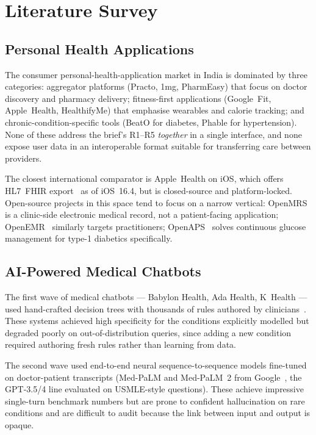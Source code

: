 \documentclass[12pt]{caltech_thesis}
\begin{document}

\chapter{Literature Survey}
\label{ch:lit}

\section{Personal Health Applications}

The consumer personal-health-application market in India is dominated by
three categories: aggregator platforms (Practo, 1mg, PharmEasy) that
focus on doctor discovery and pharmacy delivery; fitness-first applications
(Google~Fit, Apple~Health, HealthifyMe) that emphasise wearables and
calorie tracking; and chronic-condition-specific tools (BeatO for diabetes,
Phable for hypertension). None of these address the brief's R1--R5
\textit{together} in a single interface, and none expose user data in an
interoperable format suitable for transferring care between providers.

The closest international comparator is Apple~Health on iOS, which offers
HL7~FHIR export~\citep{appleHealthFHIR} as of iOS~16.4, but is closed-source
and platform-locked. Open-source projects in this space tend to focus on a
narrow vertical: OpenMRS~\citep{openmrs} is a clinic-side electronic medical
record, not a patient-facing application; OpenEMR~\citep{openemr} similarly
targets practitioners; OpenAPS~\citep{openaps} solves continuous glucose
management for type-1 diabetics specifically.

\section{AI-Powered Medical Chatbots}

The first wave of medical chatbots --- Babylon Health, Ada Health, K~Health
--- used hand-crafted decision trees with thousands of rules authored by
clinicians~\citep{semigran2015evaluation}. These systems achieved high
specificity for the conditions explicitly modelled but degraded poorly on
out-of-distribution queries, since adding a new condition required
authoring fresh rules rather than learning from data.

The second wave used end-to-end neural sequence-to-sequence models
fine-tuned on doctor-patient transcripts (Med-PaLM and Med-PaLM~2 from
Google~\citep{singhal2023large}, the GPT-3.5/4 line evaluated on USMLE-style
questions). These achieve impressive single-turn benchmark numbers but are
prone to confident hallucination on rare conditions and are difficult to
audit because the link between input and output is opaque.
\end{document}
